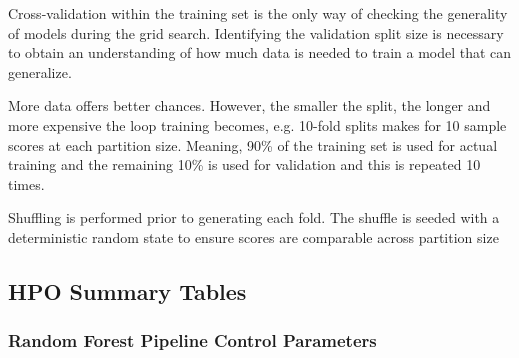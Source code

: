 \documentclass[aip, jmp, amsmath, amssymb, nofootinbib]{revtex4-2}
\begin{document}
Cross-validation within the training set is the only way of checking
the generality of models during the grid search. Identifying the
validation split size is necessary to obtain an understanding of how
much data is needed to train a model that can generalize.

More data offers better chances. However, the smaller the split, the
longer and more expensive the loop training becomes, e.g. 10-fold
splits makes for 10 sample scores at each partition size. Meaning, 90\%
of the training set is used for actual training and the remaining 10\%
is used for validation and this is repeated 10 times.

Shuffling is performed prior to generating each fold. The shuffle is
seeded with a deterministic random state to ensure scores are
comparable across partition size

\subsection*{HPO Summary Tables}
\label{sec:org8c0870f}
\subsubsection*{Random Forest Pipeline Control Parameters}
\label{sec:orgd671560}
\end{document}
